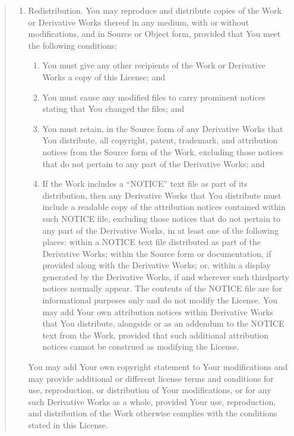 \documentclass[letterpaper,10pt,english,openany,oneside]{sphinxmanual}
\begin{document}
\begin{quote}
\begin{enumerate}
\item {} 
Redistribution. You may reproduce and distribute copies of the
Work or Derivative Works thereof in any medium, with or without
modifications, and in Source or Object form, provided that You
meet the following conditions:
\begin{enumerate}
%
\item {} 
You must give any other recipients of the Work or
Derivative Works a copy of this License; and

\item {} 
You must cause any modified files to carry prominent notices
stating that You changed the files; and

\item {} 
You must retain, in the Source form of any Derivative Works
that You distribute, all copyright, patent, trademark, and
attribution notices from the Source form of the Work,
excluding those notices that do not pertain to any part of
the Derivative Works; and

\item {} 
If the Work includes a “NOTICE” text file as part of its
distribution, then any Derivative Works that You distribute must
include a readable copy of the attribution notices contained
within such NOTICE file, excluding those notices that do not
pertain to any part of the Derivative Works, in at least one
of the following places: within a NOTICE text file distributed
as part of the Derivative Works; within the Source form or
documentation, if provided along with the Derivative Works; or,
within a display generated by the Derivative Works, if and
wherever such third\sphinxhyphen{}party notices normally appear. The contents
of the NOTICE file are for informational purposes only and
do not modify the License. You may add Your own attribution
notices within Derivative Works that You distribute, alongside
or as an addendum to the NOTICE text from the Work, provided
that such additional attribution notices cannot be construed
as modifying the License.

\end{enumerate}

You may add Your own copyright statement to Your modifications and
may provide additional or different license terms and conditions
for use, reproduction, or distribution of Your modifications, or
for any such Derivative Works as a whole, provided Your use,
reproduction, and distribution of the Work otherwise complies with
the conditions stated in this License.


\end{enumerate}
\end{quote}
\end{document}
